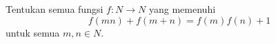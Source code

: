 Tentukan semua fungsi $f:N\rightarrow N$ yang memenuhi
$$f(mn)+f(m+n)=f(m)f(n)+1$$
untuk semua $m, n\in N$.